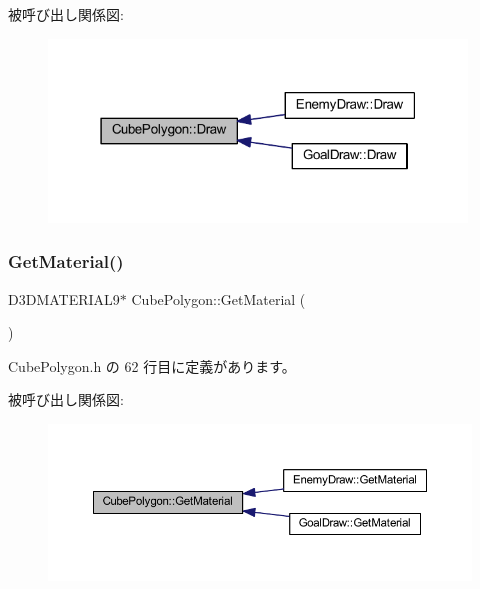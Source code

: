 被呼び出し関係図\+:\nopagebreak
\begin{figure}[H]
\begin{center}
\leavevmode
\includegraphics[width=315pt]{class_cube_polygon_ac9003cd00eea402f2b6c5fb5a77feae2_icgraph}
\end{center}
\end{figure}
\mbox{\label{class_cube_polygon_a6bd49d47a58c9c89a1ddaee37f7f4d22}} 
\subsubsection{\texorpdfstring{Get\+Material()}{GetMaterial()}}
{\footnotesize\ttfamily D3\+D\+M\+A\+T\+E\+R\+I\+A\+L9$\ast$ Cube\+Polygon\+::\+Get\+Material (\begin{DoxyParamCaption}{ }\end{DoxyParamCaption})\hspace{0.3cm}{\ttfamily [inline]}}



 Cube\+Polygon.\+h の 62 行目に定義があります。

被呼び出し関係図\+:\nopagebreak
\begin{figure}[H]
\begin{center}
\leavevmode
\includegraphics[width=350pt]{class_cube_polygon_a6bd49d47a58c9c89a1ddaee37f7f4d22_icgraph}
\end{center}
\end{figure}
\mbox{\label{class_cube_polygon_adf0956096c0d5dd31cf5b730dc8ca9c4}} 
